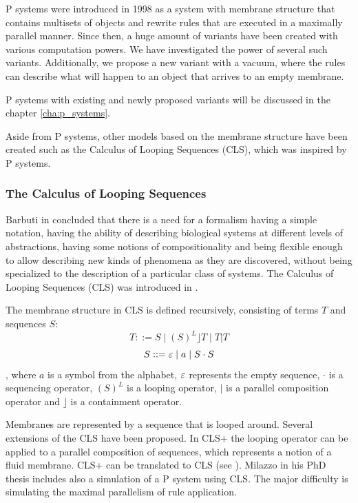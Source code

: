 P systems were introduced in 1998 as a system with membrane structure that contains multisets of objects and rewrite rules that are executed in a maximally parallel manner. Since then, a huge amount of variants have been created with various computation powers. We have investigated the power of several such variants. Additionally, we propose a new variant with a vacuum, where the rules can describe what will happen to an object that arrives to an empty membrane.

P systems with existing and newly proposed variants will be discussed in the chapter \ref{cha:p_systems}.

Aside from P systems, other models based on the membrane structure have been created such as the Calculus of Looping Sequences (CLS), which was inspired by P systems.




\subsubsection{The Calculus of Looping Sequences} %
\label{subs:calculus_of_looping_sequences}

Barbuti in \cite{Barbuti07CLS} concluded that there is a need for a formalism having a simple notation, having the ability of describing biological systems at different levels of abstractions, having some notions of compositionality and being flexible enough to allow describing new kinds of phenomena as they are discovered, without being specialized to the description of a particular class of systems. The Calculus of Looping Sequences (CLS) was introduced in \cite{Barbuti07CLS}.

The membrane structure in CLS is defined recursively, consisting of terms $T$ and sequences $S$:
$$ T ::= S \mid (S)^L\rfloor T \mid T|T$$
$$ S ::= \varepsilon \mid a \mid S\cdot S $$
, where $a$ is a symbol from the alphabet, $\varepsilon$ represents the empty sequence, $\cdot$ is a sequencing operator, $(S)^L$ is a looping operator, $|$ is a parallel composition operator and $\rfloor$ is a containment operator.

Membranes are represented by a sequence that is looped around.
Several extensions of the CLS have been proposed. In CLS+ the looping operator can be applied to a parallel composition of sequences, which represents a notion of a fluid membrane.
CLS+ can be translated to CLS (see \cite{Barbuti07CLS}).
Milazzo in his PhD thesis \cite{Milazzo07CLS} includes also a simulation of a P system using CLS. The major difficulty is simulating the maximal parallelism of rule application.



